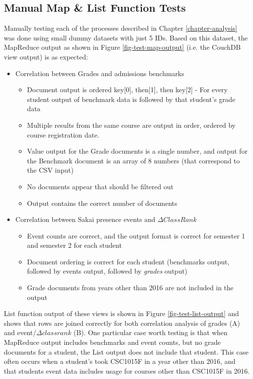 \subsection{Manual Map \& List Function Tests}
Manually testing each of the processes described in Chapter \ref{chapter-analysis} was done using small dummy datasets with just 5 IDs. Based on this dataset, the MapReduce output as shown in Figure \ref{fig-test-map-output} (i.e. the CouchDB view output) is as expected:

\begin{itemize}
  \item Correlation between Grades and admissions benchmarks
        \begin{itemize}
          \item Document output is ordered key[0], then[1], then key[2] - For every student output of benchmark data is followed by that student's grade data
          \item Multiple results from the same course are output in order, ordered by course registration date.
          \item Value output for the Grade documents is a single number, and output for the Benchmark document is an array of 8 numbers (that correspond to the CSV input)
          \item No documents appear that should be filtered out
          \item Output contains the correct number of documents
        \end{itemize}
  \item Correlation between Sakai presence events and $\Delta ClassRank$
        \begin{itemize}
          \item Event counts are correct, and the output format is correct for semester 1 and semester 2 for each student
          \item Document ordering is correct for each student (benchmarks output, followed by events output, followed by \textit{grades} output)
          \item Grade documents from years other than 2016 are not included in the output
        \end{itemize}
\end{itemize}

List function output of these views is shown in Figure \ref{fig-test-list-output} and shows that rows are joined correctly for both correlation analysis of grades (A) and event/$\Delta classrank$ (B). One particular case worth testing is that when MapReduce output includes benchmarks and event counts, but no grade documents for a student, the List output does not include that student. This case often occurs when a student's took CSC1015F in a year other than 2016, and that students event data includes usage for courses other than CSC1015F in 2016.


